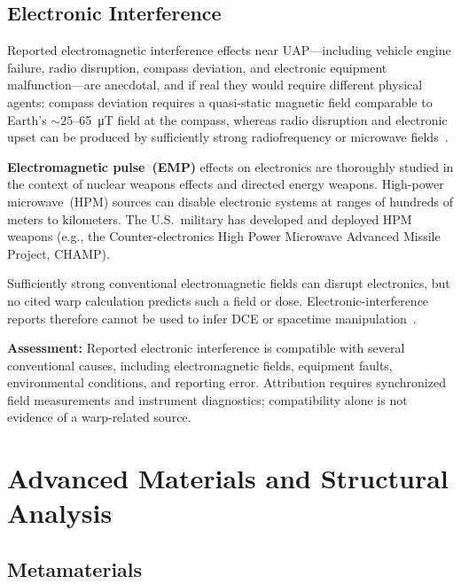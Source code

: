 \documentclass[aps,prd,twocolumn,superscriptaddress,nofootinbib,floatfix]{revtex4-2}
\begin{document}
\subsection{Electronic Interference}\label{sec:electronic-interference}

Reported electromagnetic interference effects near UAP---including vehicle engine
failure, radio disruption, compass deviation, and electronic equipment
malfunction---are anecdotal, and if real they would require different physical
agents: compass deviation requires a quasi-static magnetic field comparable to
Earth's ${\sim}25$--\SI{65}{\micro\tesla} field at the compass, whereas radio
disruption and electronic upset can be produced by sufficiently strong
radiofrequency or microwave fields~\cite{DIRD_Green}.

\textbf{Electromagnetic pulse~(EMP)} effects on electronics are thoroughly studied
in the context of nuclear weapons effects and directed energy weapons. High-power
microwave~(HPM) sources can disable electronic systems at ranges of hundreds of
meters to kilometers. The U.S.\ military has developed and deployed HPM weapons
(e.g., the Counter-electronics High Power Microwave Advanced Missile Project,
CHAMP).

Sufficiently strong conventional electromagnetic fields can disrupt electronics,
but no cited warp calculation predicts such a field or dose. Electronic-interference
reports therefore cannot be used to infer DCE or spacetime
manipulation~\cite{Wilson2011,Schutzhold2011}.

\textbf{Assessment:} Reported electronic interference is compatible with several
conventional causes, including electromagnetic fields, equipment faults,
environmental conditions, and reporting error. Attribution requires synchronized
field measurements and instrument diagnostics; compatibility alone is not evidence
of a warp-related source.

\section{Advanced Materials and Structural Analysis}\label{sec:materials}

\subsection{Metamaterials}\label{sec:metamaterials}
\end{document}
